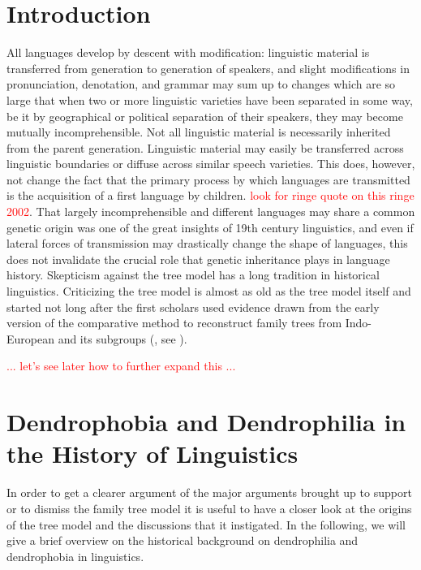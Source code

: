 \documentclass[svgnames,12pt]{scrartcl}
\newcommand\Comment[1]{\textcolor{red}{#1}}
\begin{document}
\section{Introduction}
All languages develop by descent with modification: linguistic material is transferred from
generation to generation of speakers, and slight modifications in pronunciation, denotation, and
grammar may sum up to changes which are so large that when two or more linguistic varieties have been
separated in some way, be it by geographical or political separation of their speakers, they may
become mutually incomprehensible. Not all linguistic material is necessarily inherited from the
parent generation. Linguistic material may easily be transferred across linguistic boundaries or
diffuse across similar speech varieties. This does, however, not change the fact that the primary
process by which languages are transmitted is the acquisition of a first language by children.
\textcolor{red}{look for ringe quote on this ringe 2002}. That largely incomprehensible and
different languages may share a common genetic origin was one of the great insights of 19th century
linguistics, and even if lateral forces of transmission may drastically change the shape of
languages, this does not invalidate the crucial role that genetic inheritance plays in language
history. 
Skepticism against the tree model has a long tradition in historical linguistics. Criticizing the tree model is almost as old as the tree model itself and started not long after the first scholars used evidence drawn from the early version of the comparative method to reconstruct family trees from Indo-European and its subgroups (\citealt{Celakovsky1853,Schleicher1853}, see \citealt{Geisler2013}). 

\Comment{... let's see later how to further expand this ...}

\section{Dendrophobia and Dendrophilia in the History of Linguistics}
In order to get a clearer argument of the major arguments brought up to support or to dismiss the
family tree model it is useful to have a closer look at the origins of the tree model and the
discussions that it instigated. In the following, we will give a brief overview on the historical
background on dendrophilia and dendrophobia in linguistics.
\end{document}
